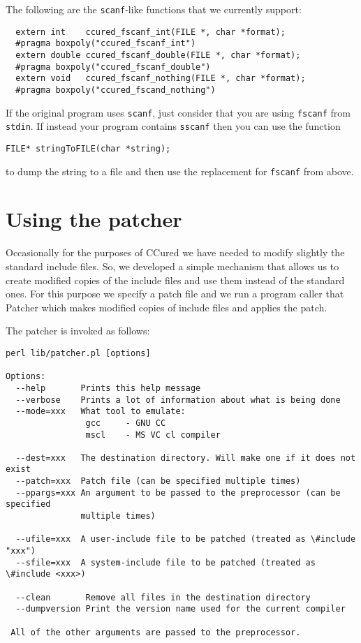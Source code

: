 \documentclass{book}
\def\t#1{{\tt #1}}
\begin{document}
 The following are the \t{scanf}-like functions that we currently support:
\begin{verbatim}
  extern int    ccured_fscanf_int(FILE *, char *format);
  #pragma boxpoly("ccured_fscanf_int")
  extern double ccured_fscanf_double(FILE *, char *format);
  #pragma boxpoly("ccured_fscanf_double")
  extern void   ccured_fscanf_nothing(FILE *, char *format);
  #pragma boxpoly("ccured_fscand_nothing")
\end{verbatim}

 If the original program uses \t{scanf}, just consider that you are using
\t{fscanf} from \t{stdin}. If instead your program contains \t{sscanf} then
you can use the function 
\begin{verbatim}
FILE* stringToFILE(char *string);
\end{verbatim}

 to dump the string to a file and then use the replacement for \t{fscanf} from
above. 


    \chapter{Using the patcher}

 Occasionally for the purposes of CCured we have needed to modify slightly the
standard include files. So, we developed a simple mechanism that allows us to
create modified copies of the include files and use them instead of the
standard ones. For this purpose we specify a patch file and we run a program
caller that Patcher which makes modified copies of include files and applies
the patch. 

 The patcher is invoked as follows: 
\begin{verbatim}
perl lib/patcher.pl [options]

Options:
  --help       Prints this help message
  --verbose    Prints a lot of information about what is being done
  --mode=xxx   What tool to emulate: 
                gcc     - GNU CC
                mscl    - MS VC cl compiler

  --dest=xxx   The destination directory. Will make one if it does not exist
  --patch=xxx  Patch file (can be specified multiple times)
  --ppargs=xxx An argument to be passed to the preprocessor (can be specified
               multiple times)

  --ufile=xxx  A user-include file to be patched (treated as \#include "xxx")
  --sfile=xxx  A system-include file to be patched (treated as \#include <xxx>)
 
  --clean       Remove all files in the destination directory
  --dumpversion Print the version name used for the current compiler

 All of the other arguments are passed to the preprocessor.
\end{verbatim}
\end{document}
